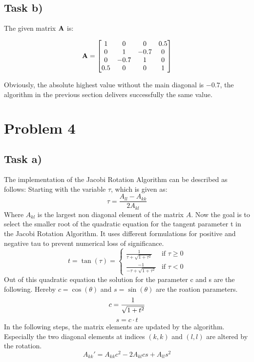 \documentclass[english,notitlepage]{revtex4-1}  %
\begin{document}
\subsection*{Task b)}
The given matrix $\bold{A}$ is:

$$
\bold{A} = 
\begin{bmatrix}
1 & 0 & 0 & 0.5 \\
0 & 1 & -0.7 & 0 \\
0 & -0.7 & 1 & 0 \\
0.5 & 0 & 0 & 1
\end{bmatrix}
$$

Obviously, the absolute highest value without the main diagonal is $-0.7$, the algorithm in the previous section delivers successfully the same value.

\section*{Problem 4}
\subsection*{Task a)}
The implementation of the Jacobi Rotation Algorithm can be described as follows:
Starting with the variable $\tau$, which is given as:
$$
\tau = \frac{A_{ll} - A_{kk}}{2A_{kl}}
$$
Where $A_{kl}$ is the largest non diagonal element of the matrix $A$.
Now the goal is to select the smaller root of the quadratic equation for the tangent parameter t in the Jacobi Rotation Algorithm. It uses different formulations for positive and negative tau to prevent numerical loss of significance.
$$
t = \tan(\tau) = \begin{cases} 
\frac{1}{\tau + \sqrt{1 + \tau^2}} & \text{if } \tau \geq 0 \\ 
\frac{-1}{-\tau + \sqrt{1 + \tau^2}} & \text{if } \tau < 0 
\end{cases}
$$
Out of this quadratic equation the solution for the parameter c and s are the following. Hereby $c= \cos{(\theta)}$ and $s= \sin{(\theta)}$ are the roation parameters.
$$
c = \frac{1}{\sqrt{1 + t^2}} \newline
$$
$$
s = c \cdot t
$$
In the following steps, the matrix elements are updated by the algorithm. 
Especially the two diagonal elements at indices $(k,k)$ and $(l,l)$ are altered by the rotation.
$$
A_{kk}' = A_{kk}c^2 - 2A_{kl}cs + A_{ll}s^2
$$
\end{document}
